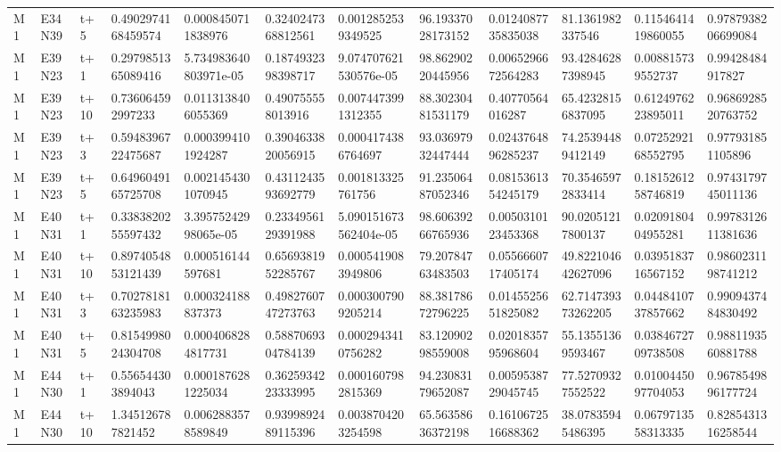 \begin{landscape}
\begin{longtable}{llllllllllll}
M1 & E34N39 & t+5 & 0.4902974168459574 & 0.0008450711838976 & 0.3240247368812561 & 0.0012852539349525 & 96.19337028173152 & 0.0124087735835038 & 81.1361982337546 & 0.1154641419860055 & 0.9787938206699084 \\
M1 & E39N23 & t+1 & 0.2979851365089416 & 5.734983640803971e-05 & 0.1874932398398717 & 9.074707621530576e-05 & 98.86290220445956 & 0.0065296672564283 & 93.42846287398945 & 0.008815739552737 & 0.99428484917827 \\
M1 & E39N23 & t+10 & 0.736064592997233 & 0.0113138406055369 & 0.490755558013916 & 0.0074473991312355 & 88.30230481531179 & 0.40770564016287 & 65.42328156837095 & 0.6124976223895011 & 0.9686928520763752 \\
M1 & E39N23 & t+3 & 0.5948396722475687 & 0.0003994101924287 & 0.3904633820056915 & 0.0004174386764697 & 93.03697932447444 & 0.0243764896285237 & 74.25394489412149 & 0.0725292168552795 & 0.977931851105896 \\
M1 & E39N23 & t+5 & 0.6496049165725708 & 0.0021454301070945 & 0.4311243593692779 & 0.001813325761756 & 91.23506487052346 & 0.0815361354245179 & 70.35465972833414 & 0.1815261258746819 & 0.9743179745011136 \\
M1 & E40N31 & t+1 & 0.3383820255597432 & 3.39575242998065e-05 & 0.2334956129391988 & 5.090151673562404e-05 & 98.60639266765936 & 0.0050310123453368 & 90.02051217800137 & 0.0209180404955281 & 0.9978312611381636 \\
M1 & E40N31 & t+10 & 0.8974054853121439 & 0.000516144597681 & 0.6569381952285767 & 0.0005419083949806 & 79.20784763483503 & 0.0556660717405174 & 49.822104642627096 & 0.0395183716567152 & 0.9860231198741212 \\
M1 & E40N31 & t+3 & 0.7027818163235983 & 0.000324188837373 & 0.4982760747273763 & 0.0003007909205214 & 88.38178672796225 & 0.0145525651825082 & 62.714739373262205 & 0.0448410737857662 & 0.9909437484830492 \\
M1 & E40N31 & t+5 & 0.8154998024304708 & 0.0004068284817731 & 0.5887069304784139 & 0.0002943410756282 & 83.12090298559008 & 0.0201835795968604 & 55.13551369593467 & 0.0384672709738508 & 0.9881193560881788 \\
M1 & E44N30 & t+1 & 0.556544303894043 & 0.0001876281225034 & 0.3625934223333995 & 0.0001607982815369 & 94.23083179652087 & 0.0059538729045745 & 77.52709327552522 & 0.0100445097704053 & 0.9678549896177724 \\
M1 & E44N30 & t+10 & 1.345126787821452 & 0.0062883578589849 & 0.9399892489115396 & 0.0038704203254598 & 65.56358636372198 & 0.1610672516688362 & 38.07835945486395 & 0.0679713558313335 & 0.8285431316258544 \\

\end{longtable}
\end{landscape}
